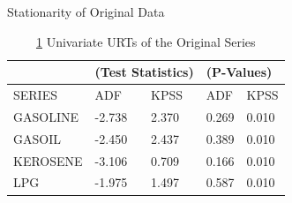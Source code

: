 \documentclass{beamer}
\begin{document}
	\begin{frame}{Stationarity of Original Data}
		\begin{table}[]
			\caption{ \ref{table:stationarity_original} Univariate URTs of the Original Series}
			\label{table:stationarity_original}
			\begin{tabular}{lllll}
				\hline
				&  \multicolumn{2}{l}{(Test Statistics)} & \multicolumn{2}{l}{(P-Values)} \\ \hline
				SERIES   & ADF                & KPSS             & ADF            & KPSS           \\
				GASOLINE & -2.738             & 2.370            & 0.269          & 0.010          \\
				GASOIL   & -2.450             & 2.437            & 0.389          & 0.010          \\
				KEROSENE & -3.106             & 0.709            & 0.166          & 0.010          \\
				LPG      & -1.975             & 1.497            & 0.587          & 0.010          \\ \hline
			\end{tabular}
		\end{table}
	\end{frame}

	
	
	
	
	
	
	
	
	
	
	
	
	
	
	
	
	
	
	
	
	
\end{document}
